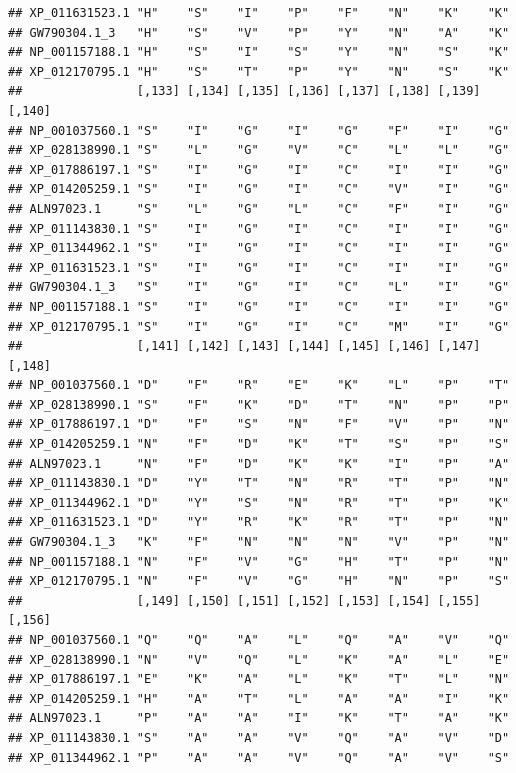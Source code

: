 \documentclass[]{article}
\begin{document}
\begin{verbatim}
## XP_011631523.1 "H"    "S"    "I"    "P"    "F"    "N"    "K"    "K"   
## GW790304.1_3   "H"    "S"    "V"    "P"    "Y"    "N"    "A"    "K"   
## NP_001157188.1 "H"    "S"    "I"    "S"    "Y"    "N"    "S"    "K"   
## XP_012170795.1 "H"    "S"    "T"    "P"    "Y"    "N"    "S"    "K"   
##                [,133] [,134] [,135] [,136] [,137] [,138] [,139] [,140]
## NP_001037560.1 "S"    "I"    "G"    "I"    "G"    "F"    "I"    "G"   
## XP_028138990.1 "S"    "L"    "G"    "V"    "C"    "L"    "L"    "G"   
## XP_017886197.1 "S"    "I"    "G"    "I"    "C"    "I"    "I"    "G"   
## XP_014205259.1 "S"    "I"    "G"    "I"    "C"    "V"    "I"    "G"   
## ALN97023.1     "S"    "L"    "G"    "L"    "C"    "F"    "I"    "G"   
## XP_011143830.1 "S"    "I"    "G"    "I"    "C"    "I"    "I"    "G"   
## XP_011344962.1 "S"    "I"    "G"    "I"    "C"    "I"    "I"    "G"   
## XP_011631523.1 "S"    "I"    "G"    "I"    "C"    "I"    "I"    "G"   
## GW790304.1_3   "S"    "I"    "G"    "I"    "C"    "L"    "I"    "G"   
## NP_001157188.1 "S"    "I"    "G"    "I"    "C"    "I"    "I"    "G"   
## XP_012170795.1 "S"    "I"    "G"    "I"    "C"    "M"    "I"    "G"   
##                [,141] [,142] [,143] [,144] [,145] [,146] [,147] [,148]
## NP_001037560.1 "D"    "F"    "R"    "E"    "K"    "L"    "P"    "T"   
## XP_028138990.1 "S"    "F"    "K"    "D"    "T"    "N"    "P"    "P"   
## XP_017886197.1 "D"    "F"    "S"    "N"    "F"    "V"    "P"    "N"   
## XP_014205259.1 "N"    "F"    "D"    "K"    "T"    "S"    "P"    "S"   
## ALN97023.1     "N"    "F"    "D"    "K"    "K"    "I"    "P"    "A"   
## XP_011143830.1 "D"    "Y"    "T"    "N"    "R"    "T"    "P"    "N"   
## XP_011344962.1 "D"    "Y"    "S"    "N"    "R"    "T"    "P"    "K"   
## XP_011631523.1 "D"    "Y"    "R"    "K"    "R"    "T"    "P"    "N"   
## GW790304.1_3   "K"    "F"    "N"    "N"    "N"    "V"    "P"    "N"   
## NP_001157188.1 "N"    "F"    "V"    "G"    "H"    "T"    "P"    "N"   
## XP_012170795.1 "N"    "F"    "V"    "G"    "H"    "N"    "P"    "S"   
##                [,149] [,150] [,151] [,152] [,153] [,154] [,155] [,156]
## NP_001037560.1 "Q"    "Q"    "A"    "L"    "Q"    "A"    "V"    "Q"   
## XP_028138990.1 "N"    "V"    "Q"    "L"    "K"    "A"    "L"    "E"   
## XP_017886197.1 "E"    "K"    "A"    "L"    "K"    "T"    "L"    "N"   
## XP_014205259.1 "H"    "A"    "T"    "L"    "A"    "A"    "I"    "K"   
## ALN97023.1     "P"    "A"    "A"    "I"    "K"    "T"    "A"    "K"   
## XP_011143830.1 "S"    "A"    "A"    "V"    "Q"    "A"    "V"    "D"   
## XP_011344962.1 "P"    "A"    "A"    "V"    "Q"    "A"    "V"    "S"   

\end{verbatim}
\end{document}

